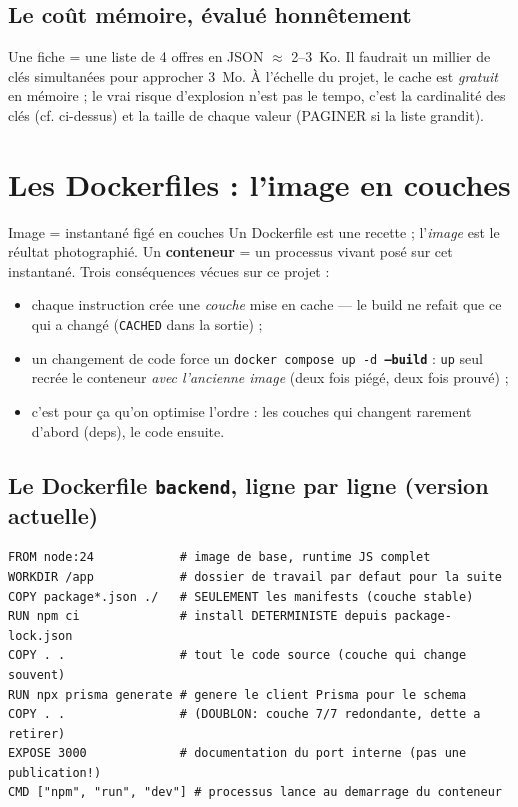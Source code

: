 \documentclass[11pt,a4paper]{article}
\begin{document}
\subsection{Le coût mémoire, évalué honnêtement}

Une fiche = une liste de 4 offres en JSON $\approx$ 2--3~Ko. Il faudrait un
millier de clés simultanées pour approcher 3~Mo. À l'échelle du projet, le
cache est \emph{gratuit} en mémoire ; le vrai risque d'explosion n'est pas le
tempo, c'est la cardinalité des clés (cf. ci-dessus) et la taille de chaque
valeur (PAGINER si la liste grandit).

\section{Les Dockerfiles : l'image en couches}

\begin{conceptbox}{Image = instantané figé en couches}
Un Dockerfile est une recette ; l'\emph{image} est le réultat photographié.
Un \textbf{conteneur} = un processus vivant posé sur cet instantané.
Trois conséquences vécues sur ce projet :
\begin{itemize}[nosep]
  \item chaque instruction crée une \emph{couche} mise en cache ---
        le build ne refait que ce qui a changé (\texttt{CACHED} dans la sortie) ;
  \item un changement de code force un \texttt{docker compose up -d
        \textbf{--build}} : \texttt{up} seul recrée le conteneur
        \emph{avec l'ancienne image} (deux fois piégé, deux fois prouvé) ;
  \item c'est pour ça qu'on optimise l'ordre : les couches qui changent
        rarement d'abord (deps), le code ensuite.
\end{itemize}
\end{conceptbox}

\subsection{Le Dockerfile \texttt{backend}, ligne par ligne (version actuelle)}

\begin{lstlisting}[language=docker]
FROM node:24            # image de base, runtime JS complet
WORKDIR /app            # dossier de travail par defaut pour la suite
COPY package*.json ./   # SEULEMENT les manifests (couche stable)
RUN npm ci              # install DETERMINISTE depuis package-lock.json
COPY . .                # tout le code source (couche qui change souvent)
RUN npx prisma generate # genere le client Prisma pour le schema
COPY . .                # (DOUBLON: couche 7/7 redondante, dette a retirer)
EXPOSE 3000             # documentation du port interne (pas une publication!)
CMD ["npm", "run", "dev"] # processus lance au demarrage du conteneur
\end{lstlisting}
\end{document}
